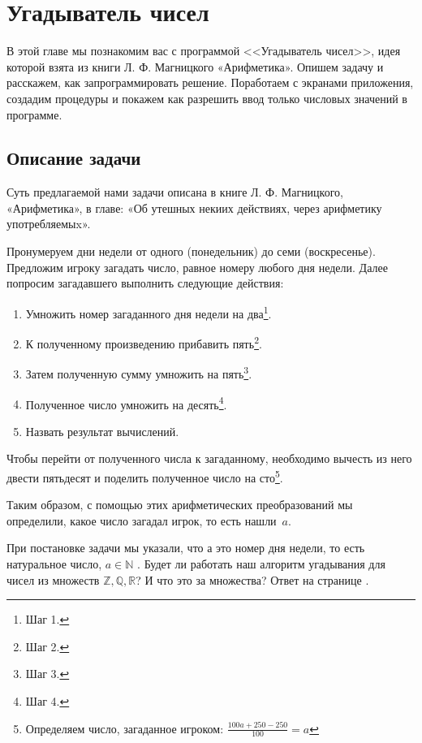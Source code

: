 \chapter{Угадыватель чисел}
\label{ch:guessnumbers}

В этой главе мы познакомим вас с программой <<Угадыватель чисел>>\cite{PanfilovaApp}, идея которой взята из книги Л. Ф. Магницкого «Арифметика»\cite{Galanin}. 
Опишем задачу и расскажем, как запрограммировать решение. Поработаем с экранами приложения, создадим процедуры и покажем как разрешить ввод только числовых значений в программе.


\section{Описание задачи}

Суть предлагаемой нами задачи описана в книге Л. Ф. Магницкого, «Арифметика», в главе: «Об утешных некиих действиях, через арифметику употребляемыx»\cite{Galanin}.

Пронумеруем дни недели от одного (понедельник) до семи (воскресенье). 
Предложим игроку загадать число, равное номеру любого дня недели. Далее попросим загадавшего выполнить следующие действия:
\begin{enumerate}
\item Умножить номер загаданного дня недели на два\footnote[][-0cm]{Шаг 1.}. 
\item К полученному произведению прибавить пять\footnote[][-0cm]{Шаг 2.}.
\item Затем полученную сумму умножить на пять\footnote[][-0cm]{Шаг 3.}.
\item Полученное число умножить на десять\footnote[][-0cm]{Шаг 4.}.
\item Назвать результат вычислений.
\end{enumerate}

Чтобы перейти от полученного числа к загаданному, необходимо вычесть из него двести пятьдесят и поделить полученное число на сто\footnote[][-0cm]{Определяем число, загаданное игроком: $\frac{100  a + 250 - 250}{100} =  a $}. 

Таким образом, с помощью этих арифметических преобразований мы определили, какое число загадал игрок, то есть нашли~$a$.
\begin{mdfstyle}[nobreak=true,frametitle=Вопрос о числовых множествах]
  \sloppy 
  При постановке задачи мы указали, что а это номер дня недели, то есть натуральное число, $ a \in \mathbb{N} $ . Будет ли работать наш алгоритм угадывания для чисел из множеств $\mathbb{Z}, \mathbb{Q}, \mathbb{R} $? И что это за множества?  
  Ответ на странице \pageref{answer:guess_numbers_task}.
  \label{question:text}
\end{mdfstyle}

